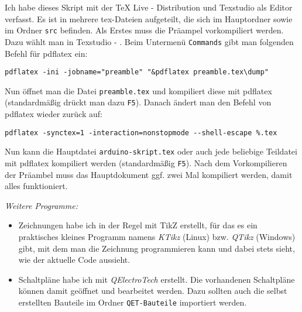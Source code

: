 Ich habe dieses Skript mit der TeX Live - Distribution und Texstudio als Editor verfasst. Es ist in mehrere tex-Dateien aufgeteilt, die sich im Hauptordner sowie im Ordner \texttt{src} befinden. Als Erstes muss die Präampel vorkompiliert werden. Dazu wählt man in Texstudio  - . Beim Untermenü \texttt{Commands} gibt man folgenden Befehl für pdflatex ein:

\medskip
\verb|pdflatex -ini -jobname="preamble" "&pdflatex preamble.tex\dump"|

\bigskip
Nun öffnet man die Datei \texttt{preamble.tex} und kompiliert diese mit pdflatex (standardmäßig drückt man dazu \texttt{F5}). Danach ändert man den Befehl von pdflatex wieder zurück auf:

\bigskip
\verb|pdflatex -synctex=1 -interaction=nonstopmode --shell-escape %.tex|
\bigskip

Nun kann die Hauptdatei \texttt{arduino-skript.tex} oder auch jede beliebige Teildatei mit pdflatex kompiliert werden (standardmäßig \texttt{F5}). Nach dem Vorkompilieren der Präambel muss das Hauptdokument ggf. zwei Mal kompiliert werden, damit alles funktioniert.

\vspace{2\baselineskip}
\emph{Weitere Programme:}

\begin{itemize}
	\item Zeichnungen habe ich in der Regel mit TikZ erstellt, für das es ein praktisches kleines Programm namens \emph{KTikz} (Linux) bzw. \emph{QTikz} (Windows) gibt, mit dem man die Zeichnung programmieren kann und dabei stets sieht, wie der aktuelle Code aussieht.
	\item Schaltpläne habe ich mit \emph{QElectroTech} erstellt. Die vorhandenen Schaltpläne können damit geöffnet und bearbeitet werden. Dazu sollten auch die selbst erstellten Bauteile im Ordner \texttt{QET-Bauteile} importiert werden.
\end{itemize}








